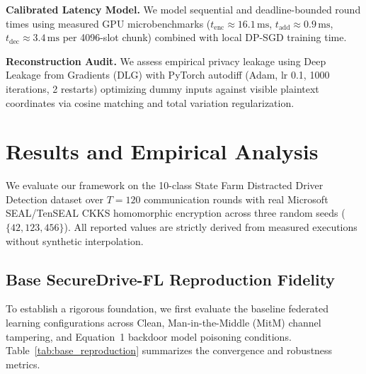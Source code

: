 \documentclass[acmtog,nonacm]{acmart}
\begin{document}
\textbf{Calibrated Latency Model.} We model sequential and deadline-bounded round times using measured GPU microbenchmarks ($t_{\text{enc}} \approx 16.1\,\text{ms}$, $t_{\text{add}} \approx 0.9\,\text{ms}$, $t_{\text{dec}} \approx 3.4\,\text{ms}$ per 4096-slot chunk) combined with local DP-SGD training time.

\textbf{Reconstruction Audit.} We assess empirical privacy leakage using Deep Leakage from Gradients (DLG) with PyTorch autodiff (Adam, lr 0.1, 1000 iterations, 2 restarts) optimizing dummy inputs against visible plaintext coordinates via cosine matching and total variation regularization.

\section{Results and Empirical Analysis}
\label{sec:results}

We evaluate our framework on the 10-class State Farm Distracted Driver Detection dataset over $T=120$ communication rounds with real Microsoft SEAL/TenSEAL CKKS homomorphic encryption across three random seeds ($\{42, 123, 456\}$). All reported values are strictly derived from measured executions without synthetic interpolation.

\subsection{Base SecureDrive-FL Reproduction Fidelity}
\label{subsec:base_reproduction}
To establish a rigorous foundation, we first evaluate the baseline federated learning configurations across Clean, Man-in-the-Middle (MitM) channel tampering, and Equation~1 backdoor model poisoning conditions. Table~\ref{tab:base_reproduction} summarizes the convergence and robustness metrics.

\begin{table}[htbp]
\centering
\caption{Base reproduction results (120 rounds, real TenSEAL CKKS, seeds $\{42, 123, 456\}$) on State Farm distracted driving.}
\label{tab:base_reproduction}
\small
{}
\end{table}
\end{document}

